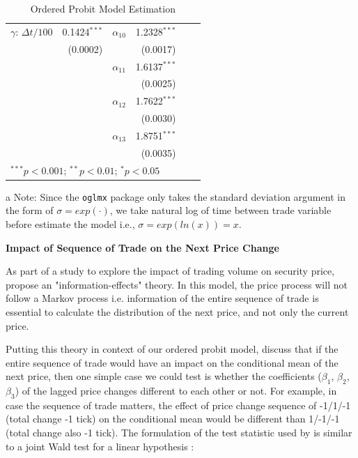\begin{table}[H]
\begin{center}
{\begin{threeparttable}
\begin{tabular}{lrlrlr}
$\gamma$: \(\Delta t/100\) \tnote{a}& 0.1424$^{***}$ & $\alpha_{10}$ & 1.2328$^{***}$ & & \\
 & (0.0002) & & (0.0017) & & \\
 
 & & $\alpha_{11}$ & 1.6137$^{***}$ & & \\
 & & & (0.0025) & & \\
 
 & & $\alpha_{12}$ & 1.7622$^{***}$ & & \\
 & & & (0.0030) & & \\
 
 & & $\alpha_{13}$ & 1.8751$^{***}$ & & \\
 & & & (0.0035) & & \\
\bottomrule
\multicolumn{6}{l}{\scriptsize{$^{***}p<0.001$; $^{**}p<0.01$; $^{*}p<0.05$}}
\end{tabular}

\begin{tablenotes}
    \small
    \item[a] Note: Since the \texttt{oglmx} package \citep{oglmx} only takes the standard deviation argument in the form of \(\sigma=exp(\cdot)\), we take natural log of time between trade variable before estimate the model i.e., \(\sigma=exp(ln(x)) = x\).
  \end{tablenotes}


\end{threeparttable}}
\caption{Ordered Probit Model Estimation}
\label{tab:table-7}
\end{center}
\end{table}



{\noindent\bfseries Impact of Sequence of Trade on the Next Price Change}

As part of a study to explore the impact of trading volume on security price, \citet{easleyohara1987} propose an "information-effects" theory. In this model, the price process will not follow a Markov process i.e. information of the entire sequence of trade is essential to calculate the distribution of the next price, and not only the current price. 

Putting this theory in context of our ordered probit model, \citet{hausman1992} discuss that if the entire sequence of trade would have an impact on the conditional mean of the next price, then one simple case we could test is whether the coefficients ($\beta_1$, $\beta_2$, $\beta_3$) of the lagged price changes different to each other or not. For example, in case the sequence of trade matters, the effect of price change sequence of -1/1/-1 (total change -1 tick) on the conditional mean would be different than 1/-1/-1 (total change also -1 tick). The formulation of the test statistic used by \citet{hausman1992} is similar to a joint Wald test for a linear hypothesis \citep{wooldridge2010}:

